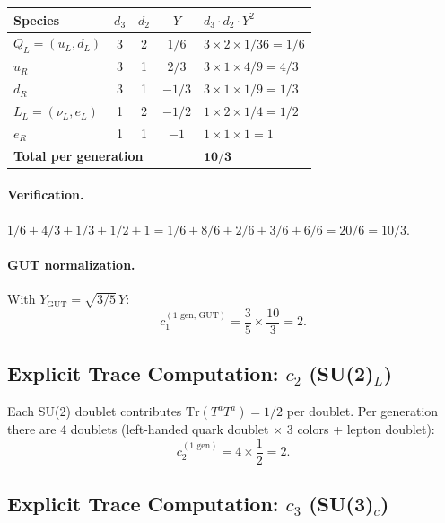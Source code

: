 \documentclass[12pt,a4paper]{article}
\begin{document}
\begin{center}
\renewcommand{\arraystretch}{1.2}
\begin{tabular}{lcccl}
\toprule
\textbf{Species} & $d_3$ & $d_2$ & $Y$ & $d_3 \cdot d_2 \cdot Y^2$ \\
\midrule
$Q_L = (u_L, d_L)$ & 3 & 2 & $1/6$ & $3 \times 2 \times 1/36 = 1/6$ \\
$u_R$ & 3 & 1 & $2/3$ & $3 \times 1 \times 4/9 = 4/3$ \\
$d_R$ & 3 & 1 & $-1/3$ & $3 \times 1 \times 1/9 = 1/3$ \\
$L_L = (\nu_L, e_L)$ & 1 & 2 & $-1/2$ & $1 \times 2 \times 1/4 = 1/2$ \\
$e_R$ & 1 & 1 & $-1$ & $1 \times 1 \times 1 = 1$ \\
\midrule
\multicolumn{4}{l}{\textbf{Total per generation}} & $\mathbf{10/3}$ \\
\bottomrule
\end{tabular}
\end{center}

\paragraph{Verification.}
$1/6 + 4/3 + 1/3 + 1/2 + 1 = 1/6 + 8/6 + 2/6 + 3/6 + 6/6 = 20/6 = 10/3$.
\checkmark

\paragraph{GUT normalization.}
With $Y_{\mathrm{GUT}} = \sqrt{3/5}\,Y$:
\begin{equation}
c_1^{(\text{1 gen, GUT})} = \frac{3}{5} \times \frac{10}{3} = 2.
\end{equation}

\subsection{Explicit Trace Computation: $c_2$ (SU(2)$_L$)}

Each SU(2) doublet contributes $\mathrm{Tr}(T^a T^a) = 1/2$ per doublet.
Per generation there are 4 doublets (left-handed quark doublet $\times$ 3
colors + lepton doublet):
\begin{equation}
c_2^{(\text{1 gen})} = 4 \times \frac{1}{2} = 2.
\end{equation}

\subsection{Explicit Trace Computation: $c_3$ (SU(3)$_c$)}
\end{document}
